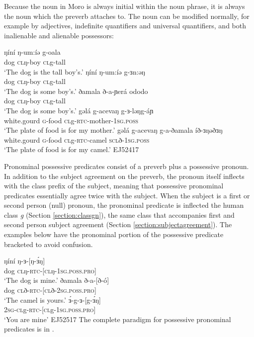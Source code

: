 Because the noun in Moro is always initial within the noun phrase, it is always the noun which the preverb attaches to. The noun can be modified normally, for example by adjectives, indefinite quantifiers and universal quantifiers, and both inalienable and alienable possessors: %

\ea 
\ea \gll  	ŋíní ŋ-um:íə g-oala\\
			dog \textsc{cl}ŋ-boy \textsc{cl}g-tall\\
	\glt 	`The dog is the tall boy's.'
\ex	\gll	ŋíní ŋ-um:íə g-ɜn:əŋ\\
			dog \textsc{cl}ŋ-boy \textsc{cl}g-tall\\
	\glt	`The dog is some boy's.'
\ex	\gll	ðamala ð-a-ɲerá ododo\\
			dog \textsc{cl}ŋ-boy \textsc{cl}g-tall\\
	\glt	`The dog is some boy's.'
\ex	\gll	gəlá g-acevaŋ g-ɜ-ləŋg-áɲ \\
			white.gourd \textsc{g}-food \textsc{cl}g-\textsc{rtc}-mother-\textsc{1sg.poss}\\
	\glt	`The plate of food is for my mother.'
\ex	\gll	gəlá g-acevaŋ g-a-ðamala íð-ɜŋəðɜŋ\\ 
			white.gourd \textsc{g}-food \textsc{cl}g-\textsc{rtc}-camel \textsc{scl}ð-\textsc{1sg.poss}\\
	\glt	`The plate of food is for my camel.' \hfill EJ52417
	\z 
\z 

Pronominal possessive predicates consist of a preverb plus a possessive pronoun. In addition to the subject agreement on the preverb, the pronoun itself inflects with the class prefix of the subject, meaning that possessive pronominal predicates essentially agree twice with the subject. When the subject is a first or second person (null) pronoun, the pronominal predicate is inflected the human class \textit{g} (Section \ref{section:classgn}), the same class that accompanies first and second person subject agreement (Section \ref{section:subjectagreement}). The examples below have the pronominal portion of the possessive predicate bracketed to avoid confusion.

\ea
\ea \gll  	ŋíní ŋ-ɜ-[ŋ-ɜ́ŋ]\\
			dog \textsc{cl}ŋ-\textsc{rtc}-[\textsc{cl}ŋ-\textsc{1sg.poss.pro}]\\
	\glt 	`The dog is mine.'
\ex \gll  	ðamala ð-a-[ð-ó]\\
			dog \textsc{cl}ð-\textsc{rtc}-[\textsc{cl}ð-\textsc{2sg.poss.pro}]\\
	\glt 	`The camel is yours.'
\ex \gll  	ɜ́-g-ɜ-[g-ɜ́ŋ] \\
			\textsc{2sg}-\textsc{cl}g-\textsc{rtc}-[\textsc{cl}g-\textsc{1sg.poss.pro}]\\
	\glt 	`You are mine'  \hfill EJ52517
\z \z  
The complete paradigm for possessive pronominal predicates is in .

